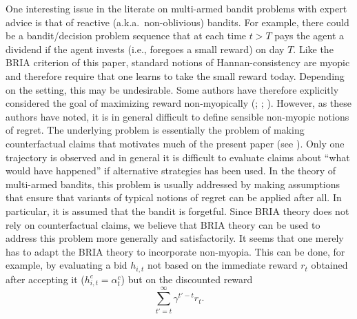 \documentclass[submission,copyright,creativecommons]{eptcs}
\begin{document}
%


\begin{extendedonlyblock}
One interesting issue in the literate on multi-armed bandit problems with expert advice is that of reactive (a.k.a.\ non-oblivious) bandits. For example, there could be a bandit/decision problem sequence that at each time $t>T$ pays the agent a dividend if the agent invests (i.e., foregoes a small reward) on day $T$. Like the BRIA criterion of this paper, standard notions of Hannan-consistency are myopic and therefore require that one learns to take the small reward today. Depending on the setting, this may be undesirable. Some authors have therefore explicitly considered the goal of maximizing reward non-myopically (\citealp{Farias2006}; \citealp[][Sect.~7.11]{Cesa-Bianchi2006}; \citealp{Arora2012}). However, as these authors have noted, it is in general difficult to define sensible non-myopic notions of regret. The underlying problem is essentially the problem of making counterfactual claims that motivates much of the present paper (see ). Only one trajectory is observed and in general it is difficult to evaluate claims about \enquote{what would have happened} if alternative strategies has been used. In the theory of multi-armed bandits, this problem is usually addressed by making assumptions that ensure that variants of typical notions of regret can be applied after all. In particular, it is assumed that the bandit is forgetful. Since BRIA theory does not rely on counterfactual claims, we believe that BRIA theory can be used to address this problem more generally and satisfactorily. It seems that one merely has to adapt the BRIA theory to incorporate non-myopia. This can be done, for example, by evaluating a bid $h_{i,t}$ not based on the immediate reward $r_t$ obtained after accepting it ($h_{i,t}^c=\alpha_t^c$) but on the discounted reward
\begin{equation}
\sum_{t'=t}^\infty \gamma^{t'-t} r_t.
\end{equation}
\end{extendedonlyblock}
\end{document}
